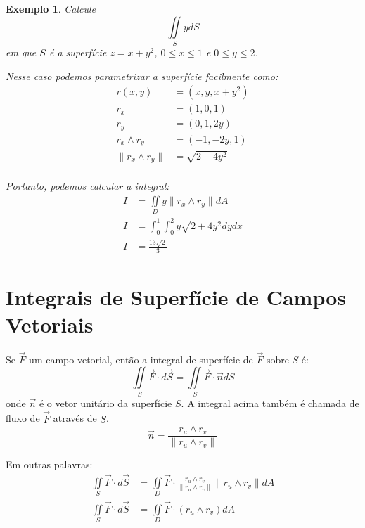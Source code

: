 \documentclass{article}
\newcommand{\doubleint}[2] {\iint\limits_{#1} #2}
\newcommand{\norm}[1] {\left.\parallel #1 \right.\parallel}
\newtheorem{example}{Exemplo}[section]
\begin{document}
            \begin{example}
                Calcule
                \[
                    \doubleint{S}{y dS}
                \]
                em que $S$ é a superfície $z = x + y^2$, $0 \leq x \leq 1$ e $0 \leq y \leq 2$.

                Nesse caso podemos parametrizar a superfície facilmente como:
                \begin{align*}
                    r(x, y) &= (x, y, x + y^2)\\
                    r_x &= (1, 0, 1)\\
                    r_y &= (0, 1, 2y)\\
                    r_x \wedge r_y &= (-1, -2y, 1)\\
                    \norm{r_x \wedge r_y} &= \sqrt{2 + 4y^2}\\
                \end{align*}

                Portanto, podemos calcular a integral:
                \begin{align*}
                    I &= \doubleint{D}{y \norm{r_x \wedge r_y} dA}\\
                    I &= \int_0^1 \int_0^2 y \sqrt{2 + 4y^2} dy dx\\
                    I &= \frac{13 \sqrt{2}}{3}
                \end{align*}
            \end{example}

    \section{Integrais de Superfície de Campos Vetoriais}
        Se $\vec{F}$ um campo vetorial, então a integral de superfície de $\vec{F}$ sobre $S$ é:
        \[
            \doubleint{S}{\vec{F} \cdot d\vec{S}} = \doubleint{S}{\vec{F} \cdot \vec{n} dS}
        \]
        onde $\vec{n}$ é o vetor unitário da superfície $S$. A integral acima também é chamada de fluxo de $\vec{F}$
        através de $S$.
        \[
            \vec{n} = \frac{r_u \wedge r_v}{\norm{r_u \wedge r_v}}
        \]

        Em outras palavras:
        \begin{align*}
            \doubleint{S}{\vec{F} \cdot d\vec{S}} &= \doubleint{D}{\vec{F} \cdot \frac{r_u \wedge r_v}{\norm{r_u \wedge r_v}} \norm{r_u \wedge r_v} dA}\\
            \doubleint{S}{\vec{F} \cdot d\vec{S}} &= \doubleint{D}{\vec{F} \cdot (r_u \wedge r_v) dA}
        \end{align*}
\end{document}
